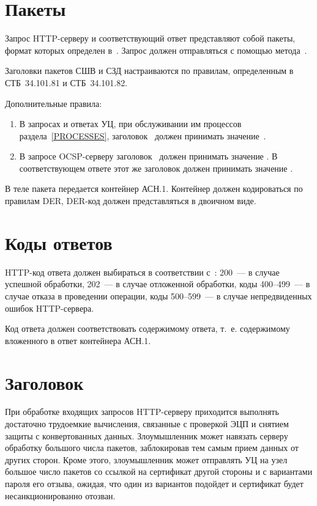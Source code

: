 \section{Пакеты}\label{TRANSPORT.Packets}

Запрос HTTP-серверу и соответствующий ответ представляют собой пакеты, формат
которых определен в~\cite{HTTP}.
%
Запрос должен отправляться с помощью метода~.

Заголовки пакетов СШВ и СЗД настраиваются по правилам, 
определенным в СТБ~34.101.81 и СТБ~34.101.82. 

Дополнительные правила:
\begin{enumerate}
\item
В запросах и ответах УЦ, при обслуживании им процессов раздела~\ref{PROCESSES},
заголовок~ должен принимать значение~.

\item
В запросе OCSP-серверу заголовок~ должен принимать значение
. В соответствующем ответе этот же заголовок
должен принимать значение .
\end{enumerate}

В теле пакета передается контейнер АСН.1. Контейнер должен кодироваться по
правилам DER, DER-код должен представляться в двоичном виде.

\section{Коды ответов}\label{TRANSPORT.Codes}

HTTP-код ответа должен выбираться в соответствии с~\cite{HTTP}: 
200~--- в случае успешной обработки, 
202~--- в случае отложенной обработки,
коды 400--499~--- в случае отказа в проведении операции,
коды 500--599~--- в случае непредвиденных ошибок HTTP-сервера.

Код ответа должен соответствовать содержимому ответа, т.~е.
содержимому вложенного в ответ контейнера АСН.1.

\section{Заголовок }\label{TRANSPORT.Nonce}

При обработке входящих запросов HTTP-серверу приходится выполнять достаточно
трудоемкие вычисления, связанные с проверкой ЭЦП и снятием защиты с
конвертованных данных.
%
Злоумышленник может навязать серверу обработку большого числа пакетов,
заблокировав тем самым прием данных от других сторон.
%
Кроме этого, злоумышленник может отправлять УЦ на узел~ большое
число пакетов со ссылкой на сертификат другой стороны и с вариантами пароля его
отзыва, ожидая, что один из вариантов подойдет и сертификат будет
несанкционированно отозван.

